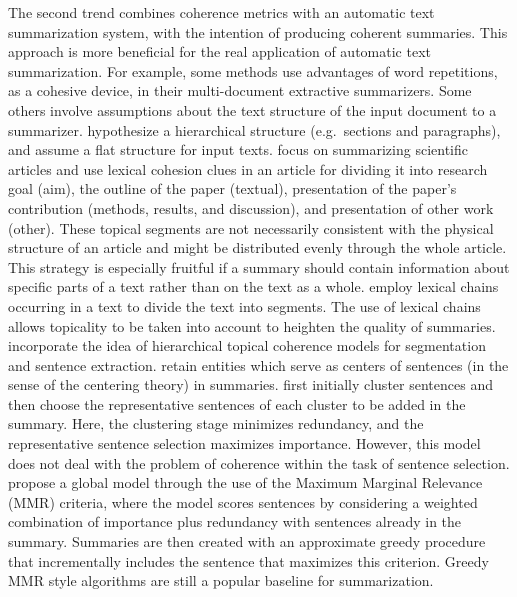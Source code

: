 The second trend combines coherence metrics with an automatic text summarization system, with the intention of producing coherent summaries.  
This approach is more beneficial for the real application of automatic text summarization. 
For example, some methods \cite{radev04a,nenkova05} use advantages of word repetitions, as a cohesive device, in their \mbox{multi-document} extractive summarizers. 
Some others involve assumptions about the text structure of the input document to a summarizer. 
 hypothesize a hierarchical structure (e.g.\ sections and paragraphs), and  assume a flat structure for input texts. 
 focus on summarizing scientific articles and use lexical cohesion clues in an article for dividing it into research goal (aim), the outline of the paper (textual), presentation of the paper's contribution (methods, results, and discussion), and presentation of other work (other). 
These topical segments are not necessarily consistent with the physical structure of an article and might be distributed evenly through the whole article. 
This strategy is especially fruitful if a summary should contain information about specific parts of a text rather than on the text as a whole.  
 employ lexical chains occurring in a text to divide the text into segments.  
The use of lexical chains allows topicality to be taken into account to heighten the quality of summaries.
 incorporate the idea of hierarchical topical coherence models for segmentation and sentence extraction. 
 retain entities which serve as centers of sentences (in the sense of the centering theory) in summaries.  
 first initially cluster sentences and then choose the representative sentences of each cluster to be added in the summary. 
Here, the clustering stage minimizes redundancy, and the representative sentence selection maximizes importance.
However, this model does not deal with the problem of coherence within the task of sentence selection. 
 propose a global model through the use of the Maximum Marginal Relevance (MMR) criteria, where the model scores sentences by considering a weighted combination of importance plus redundancy with sentences already in the summary. 
Summaries are then created with an approximate greedy procedure that incrementally includes the sentence that maximizes this criterion.  
Greedy MMR style algorithms are still a popular baseline for summarization. 

